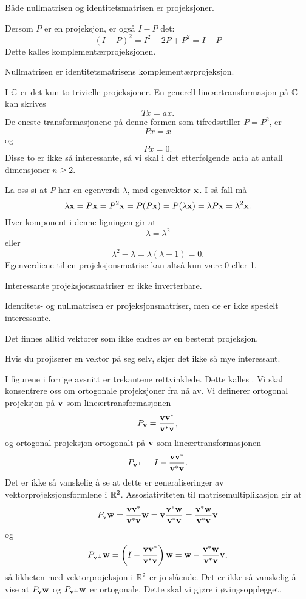  \begin{ex}
Både nullmatrisen og identitetsmatrisen er projeksjoner.
 \end{ex}
 
\noindent Dersom $P$ er en projeksjon, er også $I-P$ det:
\[
 (I-P)^2=I^2-2P+P^2=I-P
 \]
Dette kalles komplementærprojeksjonen.
 
\begin{ex}
Nullmatrisen er identitetsmatrisens  komplementærprojeksjon.
\end{ex}
 
 I $\mathbb{C}$ er det kun to trivielle projeksjoner. En generell lineærtransformasjon på $\mathbb{C}$ kan skrives 
 \[
 Tx=ax.
 \]
De eneste transformasjonene på denne formen som tifredsstiller $P=P^2$, er
 \[
 Px=x
\]
og 
 \[
 Px=0.
\]
Disse to er ikke så interessante, så vi skal i det etterfølgende anta at antall dimensjoner $n\geq 2$.

La oss si at $P$ har en egenverdi $\lambda$, med egenvektor $\mathbf{x}$. I så fall må
\[
\lambda \mathbf{x}=P\mathbf{x}=P^2\mathbf{x}=P(P\mathbf{x})=P(\lambda\mathbf{x})=\lambda P\mathbf{x}=\lambda^2 \mathbf{x}.
\]
Hver komponent i denne ligningen gir at
\[
\lambda=\lambda^2
\]
eller
\[
\lambda^2-\lambda=\lambda(\lambda-1)=0.
\]
Egenverdiene til en projeksjonsmatrise kan altså kun være  0 eller 1. 
 
\begin{fishythm}
Interessante projeksjonsmatriser er ikke inverterbare.
\end{fishythm}

\begin{merkx}
Identitets- og nullmatrisen er projeksjonsmatriser, men de er ikke spesielt interessante.
\end{merkx}

\begin{fishythm}
Det finnes alltid vektorer som ikke endres av en bestemt projeksjon.
\end{fishythm}

\begin{merkx}
Hvis du projiserer en vektor på seg selv, skjer det ikke så mye interessant.
\end{merkx}


 
 I figurene i forrige avsnitt er trekantene rettvinklede. Dette kalles . 
 Vi skal konsentrere oss om ortogonale projeksjoner fra nå av.
 Vi definerer ortogonal projeksjon på $\mathbf{v}$ som lineærtransformasjonen
 \[
 P_{\mathbf{v}}=\frac{\mathbf{v} \mathbf{v}^*}{\mathbf{v}^* \mathbf{v}},
 \]
 og ortogonal projeksjon ortogonalt på $\mathbf{v}$ som lineærtransformasjonen
 \[
 P_{\mathbf{v}^{\perp}}=I-\frac{\mathbf{v} \mathbf{v}^*}{\mathbf{v}^* \mathbf{v}}.
 \]
Det er ikke så vanskelig å se at dette er generaliseringer av vektorprojeksjonsformlene i $\mathbb{R}^2$. Assosiativiteten til matrisemultiplikasjon gir at
 \[
 P_{\mathbf{v}}\mathbf{w}=\frac{\mathbf{v} \mathbf{v}^*}{\mathbf{v}^* \mathbf{v}} \mathbf{w}=\mathbf{v} \frac{ \mathbf{v}^*\mathbf{w}}{\mathbf{v}^* \mathbf{v}}=\frac{ \mathbf{v}^*\mathbf{w}}{\mathbf{v}^* \mathbf{v}} \mathbf{v} 
 \]
og 
 \[
 P_{\mathbf{v}^{\perp}}\mathbf{w}=\left(I-\frac{\mathbf{v} \mathbf{v}^*}{\mathbf{v}^* \mathbf{v}}\right)\mathbf{w}=\mathbf{w} - \frac{ \mathbf{v}^*\mathbf{w}}{\mathbf{v}^* \mathbf{v}} \mathbf{v} ,
 \]
 så likheten med vektorprojeksjon i $\mathbb{R}^2$ er jo slående. Det er ikke så vanskelig å vise at $P_{\mathbf{v}}\mathbf{w}$ og $P_{\mathbf{v}^{\perp}}\mathbf{w}$ er ortogonale. Dette skal vi gjøre i øvingsopplegget.

